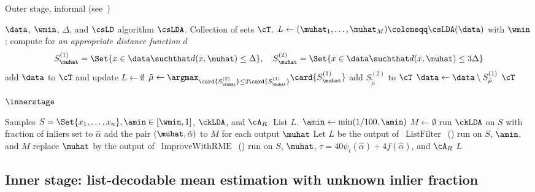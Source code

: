 \begin{algorithm}[t]
\caption{Outer stage, informal (see~)}\label{alg:first_stage_techniques}
    \begin{algorithmic}[1]
        \Require $\data$, $\wmin$, \(\Delta\), and \(\csLD\) algorithm \(\csLDA\).
        \Ensure Collection of sets $\cT$.
    \State \(L \gets (\muhat_1, \ldots, \muhat_M) \coloneqq \csLDA(\data)\) with \(\wmin\);
    \State compute for \textit{an appropriate distance function $d$} \[S_{\muhat}^{(1)} = \Set{x \in \data \suchthat d(x,\muhat)\leq \Delta}, \quad {S_{\muhat}^{(2)} = \Set{x \in \data \suchthat d(x,\muhat)\leq 3\Delta}}\]
    \EndFor
     add $\data$ to $\cT$ and update $L \leftarrow \emptyset$
    \Else {} 
    \State $\tilde{\mu} \gets \argmax_{\card{S_{\muhat}^{(2)}} \leq 2 \card{S_{\muhat}^{(1)}}} \card{S_{\muhat}^{(1)}}$
    \State add $S_{\tilde{\mu}}^{(2)}$ to $\cT$
    \State $\data \gets \data \setminus S_{\tilde{\mu}}^{(1)}$
    \EndIf
    \EndWhile
\State \Return \(\cT\)
    \end{algorithmic}
\end{algorithm}

\begin{algorithm}[t]
\caption{\(\innerstage\)}
\label{alg:first_stage_high_level}
    \begin{algorithmic}[1]
        \Require Samples \(S = \Set{x_1, \ldots, x_{n}}, \amin \in [\wmin, 1]\), 
    $\ckLDA$, and $\cA_{R}$.
        \Ensure List \(L\).
        \State \(\amin \gets \min(1/100, \amin)\)
        \State \(M \gets \emptyset\)
        \State run $\ckLDA$ on $S$ with fraction of inliers set to $\hat\alpha$
        \State add the pair $(\muhat, \hat\alpha)$ to $M$ for each output \(\muhat\)
        \EndFor
        \State Let \(L\) be the output of~\(\operatorname{ListFilter}\)~() run on \(S\), \(\amin\), and $M$
        \State replace $\muhat$ by the output of~\(\operatorname{ImproveWithRME}\)~() run on $S$, $\muhat$, $\tau = 40\psi_t(\hat\alpha)+4f(\hat\alpha)$, and $\cA_{R}$
        \EndFor
    \State \Return \(L\)
    \end{algorithmic}
\end{algorithm}

\subsection{Inner stage: list-decodable mean estimation with unknown inlier fraction}
\label{sec:inner-stage}

